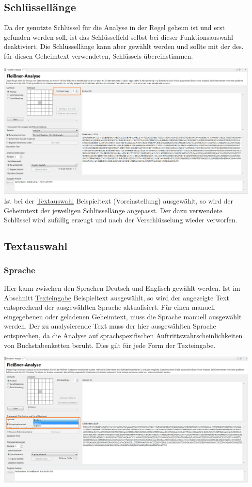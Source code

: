 \documentclass[fontsize=12pt, DIV=15, parskip=half-]{scrartcl}
\theoremstyle{break}
\begin{document}
\subsection{Schlüssellänge}
Da der genutzte Schlüssel für die Analyse in der Regel geheim ist und erst gefunden werden soll, ist das Schlüsselfeld selbst bei dieser Funktionsauswahl deaktiviert. Die Schlüssellänge kann aber gewählt werden und sollte mit der des, für diesen Geheimtext verwendeten, Schlüssels übereinstimmen.

\includegraphics[scale=0.45]{FleissnerKeySize.png}
Ist bei der \hyperlink{txtausw}{Textauswahl}  \glqq Beispieltext\grqq{} (Voreinstellung) ausgewählt, so wird der Geheimtext der jeweiligen Schlüssellänge angepasst. Der dazu verwendete Schlüssel wird zufällig erzeugt und nach der Verschlüsselung wieder verworfen.

\subsection{Textauswahl} \hypertarget{txtausw}{}
\subsubsection{Sprache}
Hier kann zwischen den Sprachen \glqq Deutsch\grqq{} und \glqq Englisch\grqq{} gewählt werden. Ist im Abschnitt \hyperlink{txteing}{Texteingabe} \glqq Beispieltext\grqq{} ausgewählt, so wird der angezeigte Text entsprechend der ausgewählten Sprache aktualisiert. Für einen manuell eingegebenen oder geladenen Geheimtext, muss die Sprache manuell ausgewählt werden. Der zu analysierende Text muss der hier ausgewählten Sprache entsprechen, da die Analyse auf sprachspezifischen Auftrittswahrscheinlichkeiten von Buchstabenketten beruht. Dies gilt für jede Form der Texteingabe.

\includegraphics[scale=0.45]{FleissnerLanguage.png}
\end{document}
